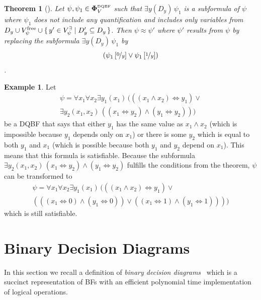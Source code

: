 \documentclass[
  digital, %
  twoside, %
  table,   %
  nolof,     %
  nolot,     %
]{fithesis3}
\let\setbuilder\set
\newcommand{\simpleset}[1]{\{{#1}\}}
\renewcommand{\set}[1]{\normalexpandarg\IfSubStr{#1}{|}{\setbuilder{#1}}{\simpleset{#1}}}
\newtheorem{theorem}{Theorem}[chapter] %
\theoremstyle{definition}
\newtheorem{example}{Example}
\theoremstyle{remark}
\newcommand{\substitute}[2]{\left[ \nicefrac{#2}{#1} \right]}
\newcommand{\DQBF}[1]{\mathbf{\Phi}_{#1}^{\normalfont{\text{\tiny DQBF}}}}
\newcommand{\evars}[1]{V_{#1}^{\exists}}
\newcommand{\fvars}[1]{V_{#1}^{\mathrm{free}}}
\newcommand{\lequal}{\Leftrightarrow}
\newcommand{\itholds}{\,}
\begin{document}
\begin{theorem}[{\cite[Theorem 5]{HQSquantifierLocalization}}]
\label{thrm:exElim}
  Let $\psi, \psi_1 \in \DQBF{V}$ such that $\exists y(D_y)\itholds\psi_1$ is a subformula of $\psi$ where $\psi_1$ does not include any quantification and includes only variables from $D_y \cup \fvars{\psi} \cup \set{y' \in \evars{\psi} | D_y' \subseteq D_y}$. Then $\psi \approx \psi'$ where $\psi'$ results from $\psi$ by replacing the subformula $\exists y(D_y)\itholds\psi_1$ by \[(\psi_1\substitute{y}{0} \lor \psi_1\substitute{y}{1})\].
\end{theorem}
\begin{example}
Let
\begin{multline*}
\psi = \forall x_1 \forall x_2 \exists y_1(x_1) \itholds (((x_1 \land x_2) \lequal y_1) \lor {} \\
\exists y_2 (x_1,x_2) \itholds ((x_1 \lequal y_2) \land (y_1 \lequal y_2)))
\end{multline*}
be a DQBF that says that either $y_1$ has the same value as $x_1 \land x_2$ (which is impossible because $y_1$ depends only on $x_1$) or there is some $y_2$ which is equal to both $y_1$ and $x_1$ (which is possible because both $y_1$ and $y_2$ depend on $x_1$). This means that this formula is satisfiable. Because the subformula $\exists y_2 (x_1,x_2) \itholds (x_1 \lequal y_2) \land (y_1 \lequal y_2)$ fulfills the conditions from the theorem, $\psi$ can be transformed to
\begin{multline*}
\psi = \forall x_1 \forall x_2 \exists y_1(x_1) \itholds (((x_1 \land x_2) \lequal y_1) \lor {}\\
(((x_1 \lequal 0) \land (y_1 \lequal 0)) \lor ((x_1 \lequal 1) \land (y_1 \lequal 1))))
\end{multline*}
which is still satisfiable.
\end{example}



\section{Binary Decision Diagrams}
In this section we recall a definition of \emph{binary decision diagrams}~\cite{BDD} which is a succinct representation of BFs with an efficient polynomial time implementation of logical operations.
\end{document}
